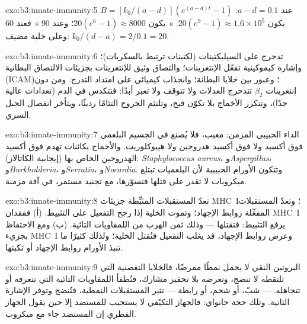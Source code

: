 \begin{solution}{exo:b3:innate-immunity:5}
$B = [k_{0}/(a-d)](e^{(a-d)t} - 1)$ عند $a - d = 0.1$: فعند \qty{60}{s}
يكون $20(e^{6} - 1) \approx 8000$؛ وعند \qty{90}{s} يكون $20(e^{9} - 1) \approx
1.6\times 10^{5}$. وعلى خلية مضيف: $k_{0}/(d - a) = 2/0.1 = 20$.
\end{solution}

\begin{solution}{exo:b3:innate-immunity:6}
تدحرج على السيليكتينات (لكتينات ترتبط بالسكريات)؛ وإشارة
كيموكينية تفعّل الإنتغرينات؛ والتصاق وثيق للإنتغرينات
بجزيئات الالتصاق البطانية (ICAM)؛ وعبور بين خلايا البطانة؛
وانجذاب كيميائي على امتداد التدرج. ومن دون إنتغرينات
$\beta_{2}$ تتدحرج العدلات ولا تتوقف ولا تعبر أبدًا:
فتتكدس في الدم (تعدادات عالية جدًا)، وتتكرر الأخماج بلا
تكوّن قيح، وتلتئم الجروح التئامًا رديئًا، ويتأخر انفصال
الحبل السري.
\end{solution}

\begin{solution}{exo:b3:innate-immunity:7}
الداء الحبيبي المزمن:  معيب، فلا يُصنع في
الجسيم البلعمي فوق أكسيد ولا فوق أكسيد هدروجين ولا
هيبوكلوريت. والأخماج بكائنات تهدم فوق أكسيد الهدروجين الخاص
بها (إيجابية الكاتالاز): \emph{Staphylococcus aureus}،
و\emph{Aspergillus}، و\emph{Burkholderia}، و\emph{Serratia}،
و\emph{Nocardia}. وتتكون الأورام الحبيبية لأن البلعميات
تبتلع ميكروبات لا تقدر على قتلها فتسوّرها، مع تجنيد مستمر،
في آفة مزمنة.
\end{solution}

\begin{solution}{exo:b3:innate-immunity:8}
تعدّ المستقبلات المثبِّطة جزيئات MHC~I؛ وتعدّ المستقبلات
المفعِّلة روابط الإجهاد؛ وتموت الخلية إذا رجح التفعيل على
التثبيط. (أ) ففقدان MHC~I يرفع التثبيط: فتقتلها  --- وذلك ثمن الهرب من اللمفاويات التائية.
(ب) ومع الاحتفاظ بجزيء MHC~I وعرض روابط الإجهاد، قد يغلب
التفعيل فتُقتل الخلية؛ ولذلك كثيرًا ما تنبذ الأورام روابط
الإجهاد أو تكبتها.
\end{solution}

\begin{solution}{exo:b3:innate-immunity:9}
البروتين النقي لا يحمل نمطًا ممرضًا، فالخلايا التغصنية التي
تلتقطه لا تنضج، وتعرضه بلا تحفيز مشارك، فتُطفأ اللمفاويات
التائية التي تتعرفه أو تتجاهله.  --- شبّ، أو
شحم، أو رابطة  --- تثير المستقبلات
النمطية، فتُنضج  وتوفر الإشارة الثانية. وتلك
حجة جانواي: فالجهاز التكيّفي لا يستجيب للمستضد إلا حين يقول
الجهاز الفطري إن المستضد جاء مع ميكروب.
\end{solution}

